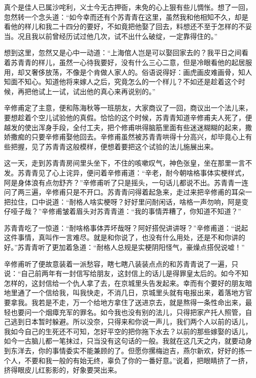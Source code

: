 \documentclass[12pt,UTF8]{ctexbook}
\begin{document}
{{{真个是佳人已属沙咤利，义士今无古押衙，未免的心上狠有些儿惆怅。想了一回，忽然转一个念头道：“如今幸而还有个苏青青在这里，虽然我和他相知不久，却是看他的样儿和我二十四分的要好，不如竟把他娶了回去，料想还不至于怎样的不妥当。况且我以前曾经历试过他几次，试不出什么破绽，一定靠得住的。”

想到这里，忽然又是心中一动道：“上海倌人岂是可以娶回家去的？我平日之间看着苏青青的样儿，虽然一心待我要好，没有什么三心二意，但是冷眼看他的起居服用，却又奢侈放荡，不像是个肯做人家人的。俗语说得好：画虎画皮难画骨，知人知面不知心。知道他将来嫁人之后，究竟怎么的一个样儿？不如还是趁着这个时候，再把他试上一试，试出他的真心来再说别的。”

辛修甫定了主意，便和陈海秋等一班朋友，大家商议了一回，商议出一个法儿来，要想趁着个空儿试验他的真假。恰恰的这个时候，苏青青知道辛修甫夫人死了，便越发的使出浑身手段，全付工夫，把个修甫哄得脑筋里面有些迷迷糊糊的起来，撒娇撒痴的只要辛修甫娶他回去。辛修甫虽然被苏青青哄得十分高兴，却毕竟心上有些把握，见了苏青青这般模样，便想着要把这个试验的法儿施展出来。

这一天，走到苏青青房间里头坐下，不住的咳嗽叹气，神色张皇，坐在那里一言不发。苏青青见了心上诧异，便问着辛修甫道：“辛老，耐今朝啥格事体实梗样式，阿是身体浪有点勿舒齐？”辛修甫听了只是摇头，一句话儿都说不出。苏青青一连问了两三遍，辛修甫只是不开口。苏青青问得着起急来，走过来把辛修甫的耳朵一把拉住，口中说道：“耐格人啥实梗呀？好好里问耐闲话，啥格一声勿响，阿是变仔哑子哉？”辛修甫皱着眉头对苏青青道：“我的事情弄糟了，你知道不知道？”

苏青青吃了一惊道：“耐啥格事体弄坏哉呀？阿好搭倪讲讲呀？”辛修甫道：“说起这件事情，真叫作一言难尽。就是和你说了，也没有什么用处，还是不和你讲的好。”苏青青听了更加着急道：“耐格人总规是实梗阴阳怪气，豪燥点搭倪说嘘！”

辛修甫听了便故意装着一派愁容，瞎七瞎八装装点点的和苏青青说了一遍，只说：“自己前两年有一封信写给朋友，这封信上的话儿是得罪皇太后的。如今不知怎样的，这封信给一个仇人拿了去，在京城里头告发起来。幸而有个要好的朋友暗地里通了一个信给我，叫我快走，不消几日，京城里头就有电报出来，着落地方官要拿我。我若是不走，万一个给地方拿住了送进京去，就是熬得一条性命出来，最轻也要问一个烟瘴充军的罪名。如今我也没有别的法儿，只得把家产托人照管，自己逃到日本暂时躲避。所以没奈，只得来和你说一声儿，我们两个人以前的话儿，我如今自己的生死还不可知，怎好平空的把你拖下水去？以前的那些嫁娶的话儿，如今一古脑儿都一笔抹过，只当没有这句话的一般。我就在这几天之内，就要动身到东洋去，你的事情委实不能兼顾的了。但愿你摞梅迨吉，燕尔新欢，好好的拣一个人，不要和我一般的有始无终，辜负了你的一番好意。”说着，把眼睛挤了一挤，挤得眼皮儿红影影的，好象要哭出来。

}}}
\end{document}

